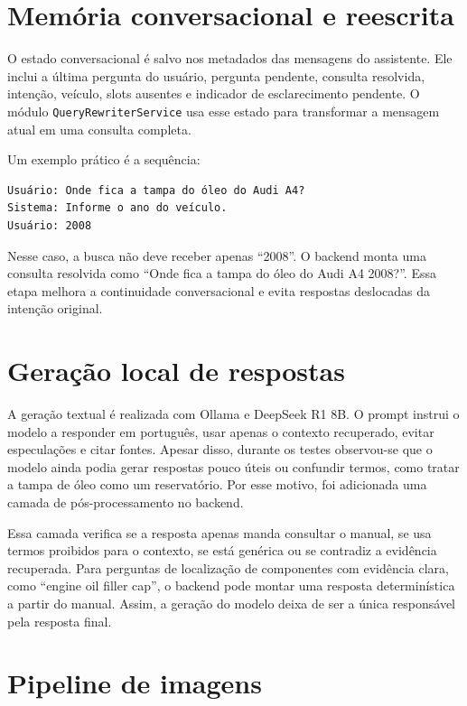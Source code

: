 \section{Memória conversacional e reescrita}

O estado conversacional é salvo nos metadados das mensagens do assistente. Ele inclui a última pergunta do usuário, pergunta pendente, consulta resolvida, intenção, veículo, slots ausentes e indicador de esclarecimento pendente. O módulo \texttt{QueryRewriterService} usa esse estado para transformar a mensagem atual em uma consulta completa.

Um exemplo prático é a sequência:

\begin{verbatim}
Usuário: Onde fica a tampa do óleo do Audi A4?
Sistema: Informe o ano do veículo.
Usuário: 2008
\end{verbatim}

Nesse caso, a busca não deve receber apenas ``2008''. O backend monta uma consulta resolvida como ``Onde fica a tampa do óleo do Audi A4 2008?''. Essa etapa melhora a continuidade conversacional e evita respostas deslocadas da intenção original.

\section{Geração local de respostas}

A geração textual é realizada com Ollama e DeepSeek R1 8B. O prompt instrui o modelo a responder em português, usar apenas o contexto recuperado, evitar especulações e citar fontes. Apesar disso, durante os testes observou-se que o modelo ainda podia gerar respostas pouco úteis ou confundir termos, como tratar a tampa de óleo como um reservatório. Por esse motivo, foi adicionada uma camada de pós-processamento no backend.

Essa camada verifica se a resposta apenas manda consultar o manual, se usa termos proibidos para o contexto, se está genérica ou se contradiz a evidência recuperada. Para perguntas de localização de componentes com evidência clara, como ``engine oil filler cap'', o backend pode montar uma resposta determinística a partir do manual. Assim, a geração do modelo deixa de ser a única responsável pela resposta final.

\section{Pipeline de imagens}

